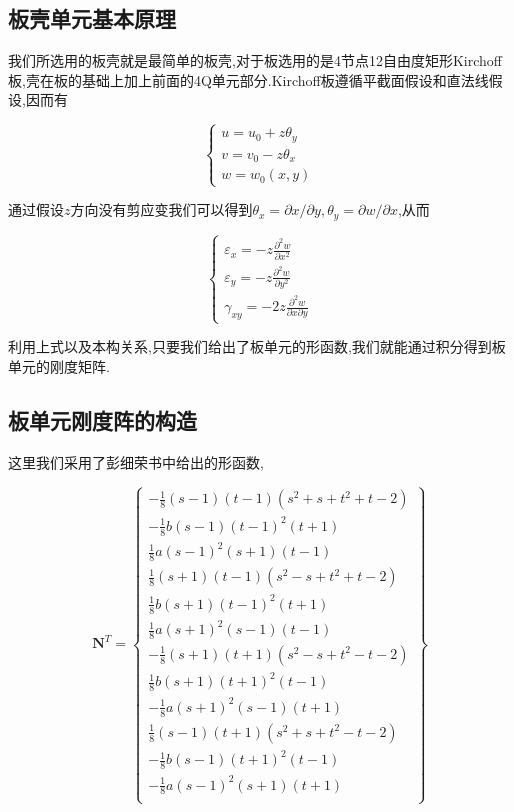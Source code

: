 
\subsection{板壳单元基本原理}
我们所选用的板壳就是最简单的板壳,对于板选用的是4节点12自由度矩形Kirchoff板,壳在板的基础上加上前面的4Q单元部分.Kirchoff板遵循平截面假设和直法线假设,因而有

\[
\left\{ \begin{gathered}
u=u_0+z\theta_y \\
v=v_0-z\theta_x \\
w=w_0(x,y)
\end{gathered} \right.
\]

通过假设$z$方向没有剪应变我们可以得到$\theta_x=\partial x/\partial y, \theta_y=\partial w/\partial x$,从而

\[
\left\{ \begin{gathered}
\varepsilon_x = -z\frac{\partial^2 w}{\partial x^2} \\
\varepsilon_y = -z\frac{\partial^2 w}{\partial y^2} \\
\gamma_{xy} = -2z\frac{\partial^2 w}{\partial x \partial y}
\end{gathered} \right.
\]

利用上式以及本构关系,只要我们给出了板单元的形函数,我们就能通过积分得到板单元的刚度矩阵.

\subsection{板单元刚度阵的构造}

这里我们采用了彭细荣书中给出的形函数,

\[ \mathbf{N}^T=\left\{
\begin{array}{c}
-\frac{1}{8}(s-1)(t-1)(s^2+s+t^2+t-2)\\ -\frac{1}{8}b(s-1)(t-1)^2(t+1)\\ \frac{1}{8}a(s-1)^2(s+1)(t-1) \\
\frac{1}{8}(s+1)(t-1)(s^2-s+t^2+t-2) \\ \frac{1}{8}b(s+1)(t-1)^2(t+1) \\ \frac{1}{8}a(s+1)^2(s-1)(t-1) \\
-\frac{1}{8}(s+1)(t+1)(s^2-s+t^2-t-2)\\ \frac{1}{8}b(s+1)(t+1)^2(t-1) \\ -\frac{1}{8}a(s+1)^2(s-1)(t+1) \\
\frac{1}{8}(s-1)(t+1)(s^2+s+t^2-t-2) \\ -\frac{1}{8}b(s-1)(t+1)^2(t-1) \\ -\frac{1}{8}a(s-1)^2(s+1)(t+1) \\
\end{array} \right\} \]

